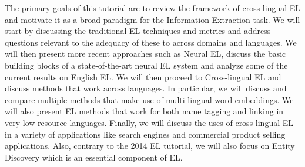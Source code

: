 The primary goals of this tutorial are to review the framework of cross-lingual EL and motivate it as a broad paradigm for the Information Extraction task. We will start by discussing the traditional EL techniques and metrics and address questions relevant to the adequacy of these to across domains and languages. We will then present more recent approaches such as Neural EL, discuss the basic building blocks of a state-of-the-art neural EL system and analyze some of the current results on English EL. We will then proceed to Cross-lingual EL and discuss methods that work across languages. In particular, we will discuss and compare multiple methods that make use of multi-lingual word embeddings. We will also present EL methods that work for both name tagging and linking in very low resource languages. Finally, we will discuss the uses of cross-lingual EL in a variety of applications like search engines and commercial product selling applications. Also, contrary to the 2014 EL tutorial, we will  also focus on Entity Discovery which is an essential component of EL.
